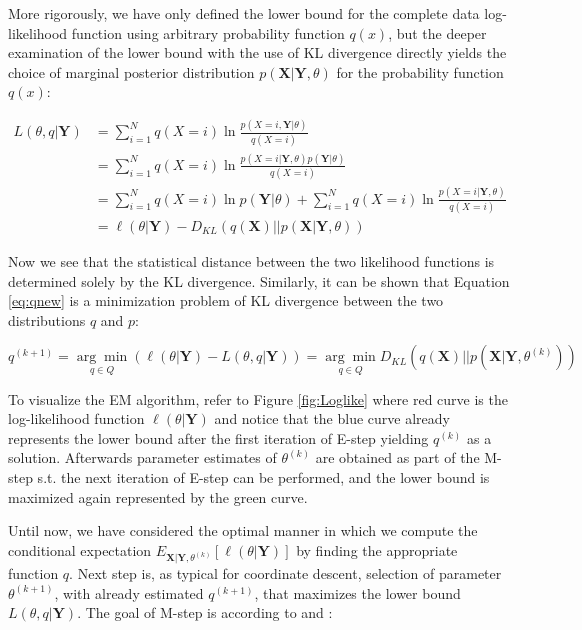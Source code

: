 More rigorously, we have only defined the lower bound for the complete data log-likelihood function using arbitrary probability function $q(x)$, 
but the deeper examination of the lower bound with the use of KL divergence directly yields the choice of marginal posterior 
distribution $p(\textbf{X}|\textbf{Y},\theta)$ for the probability function $q(x)$:

\begin{align}
    L(\theta,q|\textbf{Y}) &= \sum_{i=1}^{N} q(X = i) \ln \frac{p(X = i,\textbf{Y}|\theta)}{q(X = i)} \\
    & = \sum_{i=1}^{N} q(X = i) \ln \frac{p(X = i|\textbf{Y},\theta) p(\textbf{Y}| \theta)}{q(X = i)} \\
    & = \sum_{i=1}^{N} q(X = i) \ln p(\textbf{Y}|\theta) + \sum_{i=1}^{N} q(X = i) \ln \frac{p(X = i|\textbf{Y},\theta)}{q(X = i)} \\
    & =  \ell(\theta|\textbf{Y}) - D_{KL}(q(\textbf{X})||p(\textbf{X}|\textbf{Y},\theta))
\end{align}

Now we see that the statistical distance between the two likelihood functions is determined solely by the KL divergence. Similarly, it can be shown that Equation \ref{eq:qnew} is a 
minimization problem of KL divergence between the two distributions $q$ and $p$:

\begin{equation}
    q^{(k+1)} = \underset{q \in Q}{\arg\min}(\ell(\theta|\textbf{Y}) - L(\theta, q|\textbf{Y})) = \underset{q \in Q}{\arg\min}  D_{KL} (q(\textbf{X}) || p(\textbf{X}| \textbf{Y},\theta^{(k)}))
\end{equation}

To visualize the EM algorithm, refer to Figure \ref{fig:Loglike} where red curve is the log-likelihood function $\ell(\theta|\textbf{Y})$
and notice that the blue curve already represents the lower bound
after the first iteration of E-step yielding $q^{(k)}$ as a solution. Afterwards parameter estimates of $\theta^{(k)}$ are obtained as part of the M-step 
s.t. the next iteration of E-step can be performed, and the lower bound is maximized again represented by the green curve.

Until now, we have considered the optimal manner in which we compute the conditional expectation $E_{\textbf{X}|\textbf{Y},\theta^{(k)}} [\ell(\theta|\textbf{Y})]$ by 
finding the appropriate function $q$. Next step is, as typical for coordinate descent, selection of parameter $\theta^{(k+1)}$, 
with already estimated $q^{(k+1)}$, that maximizes the lower bound $L(\theta,q|\textbf{Y})$. The goal of M-step is according to \citep{Dempster1977} and \citep{Gu2008}:

